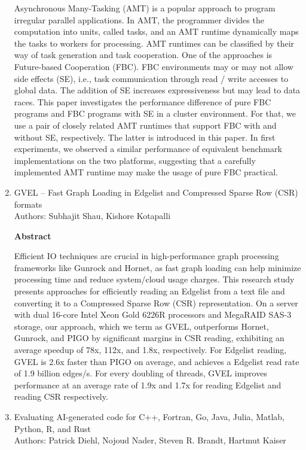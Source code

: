\documentclass{article}
\begin{document}
\begin{enumerate}
  Asynchronous Many-Tasking (AMT) is a popular approach to program irregular parallel applications. In AMT, the programmer divides the computation into units, called tasks, and an AMT runtime dynamically maps the tasks to workers for processing. AMT runtimes can be classified by their way of task generation and task cooperation. One of the approaches is Future-based Cooperation (FBC). FBC environments may or may not allow side effects (SE), i.e., task communication through read / write accesses to global data. The addition of SE increases expressiveness but may lead to data races. This paper investigates the performance difference of pure FBC programs and FBC programs with SE in a cluster environment. For that, we use a pair of closely related AMT runtimes that support FBC with and without SE, respectively. The latter is introduced in this paper. In first experiments, we observed a similar performance of equivalent benchmark implementations on the two platforms, suggesting that a carefully implemented AMT runtime may make the usage of pure FBC practical.
        \item GVEL – Fast Graph Loading in Edgelist and Compressed Sparse Row (CSR) formats \\
    Authors: Subhajit Shau, Kishore Kotapalli
    \begin{center}
        \textbf{Abstract}
    \end{center}
Efficient IO techniques are crucial in high-performance graph processing frameworks like Gunrock and Hornet, as fast graph loading can help minimize processing time and reduce system/cloud usage charges. This research study presents approaches for efficiently reading an Edgelist from a text file and converting it to a Compressed Sparse Row (CSR) representation. On a server with dual 16-core Intel Xeon Gold 6226R processors and MegaRAID SAS-3 storage, our approach, which we term as GVEL, outperforms Hornet, Gunrock, and PIGO by significant margins in CSR reading, exhibiting an average speedup of 78x, 112x, and 1.8x, respectively. For Edgelist reading, GVEL is 2.6x faster than PIGO on average, and achieves a Edgelist read rate of 1.9 billion edges/s. For every doubling of threads, GVEL improves performance at an average rate of 1.9x and 1.7x for reading Edgelist and reading CSR respectively.
     \item Evaluating AI-generated code for C++, Fortran, Go, Java, Julia, Matlab, Python, R, and Rust\\
    Authors: Patrick Diehl, Nojoud Nader, Steven R. Brandt, Hartmut Kaiser
    \begin{center}

\end{center}
\end{enumerate}
\end{document}
